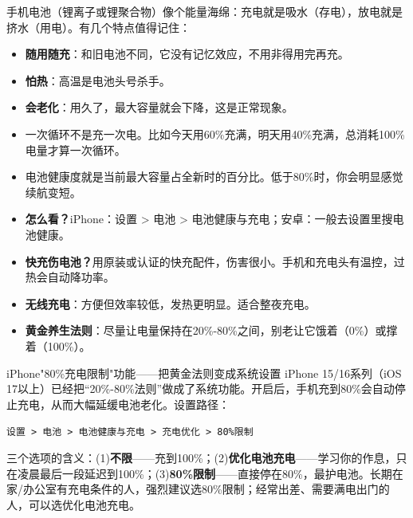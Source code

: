 


手机电池（锂离子或锂聚合物）像个能量海绵：充电就是吸水（存电），放电就是挤水（用电）。有几个特点值得记住：

\begin{itemize}
  \item \textbf{随用随充}：和旧电池不同，它没有记忆效应，不用非得用完再充。
  \item \textbf{怕热}：高温是电池头号杀手。
  \item \textbf{会老化}：用久了，最大容量就会下降，这是正常现象。
\end{itemize}


\begin{itemize}
  \item 一次循环不是充一次电。比如今天用60\%充满，明天用40\%充满，总消耗100\%电量才算一次循环。
  \item 电池健康度就是当前最大容量占全新时的百分比。低于80\%时，你会明显感觉续航变短。
  \item \textbf{怎么看？}iPhone：设置 > 电池 > 电池健康与充电；安卓：一般去设置里搜电池健康。
\end{itemize}


\begin{itemize}
  \item \textbf{快充伤电池？}用原装或认证的快充配件，伤害很小。手机和充电头有温控，过热会自动降功率。
  \item \textbf{无线充电}：方便但效率较低，发热更明显。适合整夜充电。
  \item \textbf{黄金养生法则}：尽量让电量保持在20\%-80\%之间，别老让它饿着（0\%）或撑着（100\%）。
\end{itemize}

\begin{tcbinfo}{iPhone"80\%充电限制"功能——把黄金法则变成系统设置}
iPhone 15/16系列（iOS 17以上）已经把“20\%-80\%法则”做成了系统功能。开启后，手机充到80\%会自动停止充电，从而大幅延缓电池老化。设置路径：

\texttt{设置 > 电池 > 电池健康与充电 > 充电优化 > 80\%限制}

三个选项的含义：(1)\textbf{不限}——充到100\%；(2)\textbf{优化电池充电}——学习你的作息，只在凌晨最后一段延迟到100\%；(3)\textbf{80\%限制}——直接停在80\%，最护电池。长期在家/办公室有充电条件的人，强烈建议选80\%限制；经常出差、需要满电出门的人，可以选优化电池充电。

\end{tcbinfo}

